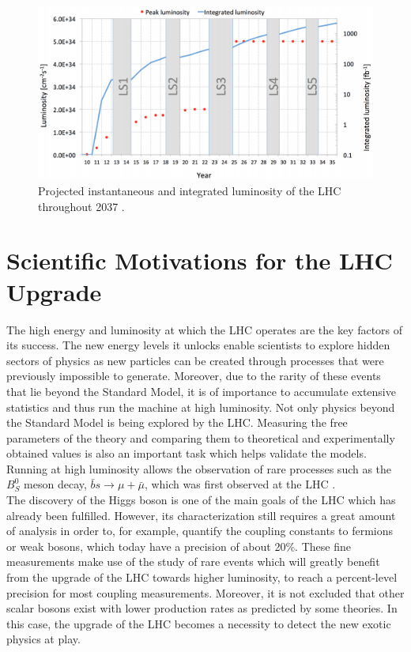     \begin{figure}[t!]
      \centering
      \includegraphics[width=\textwidth]{img/I-2-LHC/lhc-schedule.png}
      \caption{Projected instantaneous and integrated luminosity of the LHC throughout 2037 \cite{HOME-CERN}.}
      \label{fig:I-2-future}
    \end{figure}

  \section{Scientific Motivations for the LHC Upgrade}

    The high energy and luminosity at which the LHC operates are the key factors of its success. The new energy levels it unlocks enable scientists to explore hidden sectors of physics as new particles can be created through processes that were previously impossible to generate. Moreover, due to the rarity of these events that lie beyond the Standard Model, it is of importance to accumulate extensive statistics and thus run the machine at high luminosity. Not only physics beyond the Standard Model is being explored by the LHC. Measuring the free parameters of the theory and comparing them to theoretical and experimentally obtained values is also an important task which helps validate the models. Running at high luminosity allows the observation of rare processes such as the $ B^0_S $ meson decay, $ \bar{b}s \rightarrow \mu + \bar{\mu} $, which was first observed at the LHC \cite{b0smumu}. \\

    The discovery of the Higgs boson is one of the main goals of the LHC which has already been fulfilled. However, its characterization still requires a great amount of analysis in order to, for example, quantify the coupling constants to fermions or weak bosons, which today have a precision of about 20\%. These fine measurements make use of the study of rare events which will greatly benefit from the upgrade of the LHC towards higher luminosity, to reach a percent-level precision for most coupling measurements. Moreover, it is not excluded that other scalar bosons exist with lower production rates as predicted by some theories. In this case, the upgrade of the LHC becomes a necessity to detect the new exotic physics at play. \\

